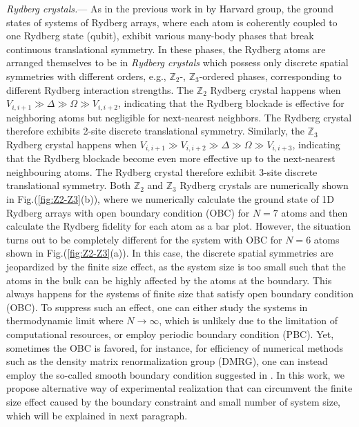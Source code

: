 \documentclass[%
 reprint,
nofootinbib,
 amsmath,amssymb,
 aps,
pra,
floatfix,
]{revtex4-2}
\begin{document}
\emph{Rydberg crystals.}--- As in the previous work in \cite{Bernien2017ProbingSimulator} by Harvard group, the ground states of systems of Rydberg arrays, where each atom is coherently coupled to one Rydberg state (qubit), exhibit various many-body phases that break continuous translational symmetry. In these phases, the Rydberg atoms are arranged themselves to be in \emph{Rydberg crystals} which possess only discrete spatial symmetries with different orders, e.g., $\mathbb{Z}_2$-, $\mathbb{Z}_3$-ordered phases, corresponding to different Rydberg interaction strengths. The $\mathbb{Z}_2$ Rydberg crystal happens when $V_{i,i+1} \gg \Delta \gg \Omega \gg V_{i,i+2}$, indicating that the Rydberg blockade is effective for neighboring atoms but negligible for next-nearest neighbors. The Rydberg crystal therefore exhibits 2-site discrete translational symmetry. Similarly, the $\mathbb{Z}_3$ Rydberg crystal happens when $V_{i,i+1} \gg V_{i,i+2} \gg \Delta \gg \Omega \gg V_{i,i+3}$, indicating that the Rydberg blockade become even more effective up to the next-nearest neighbouring atoms. The Rydberg crystal therefore exhibit 3-site discrete translational symmetry. Both $\mathbb{Z}_2$ and $\mathbb{Z}_3$ Rydberg crystals are numerically shown in Fig.(\ref{fig:Z2-Z3}(b)), where we numerically calculate the ground state of 1D Rydberg arrays with open boundary condition (OBC) for $N=7$ atoms and then calculate the Rydberg fidelity for each atom as a bar plot. However, the situation turns out to be completely different for the system with OBC for $N=6$ atoms shown in Fig.(\ref{fig:Z2-Z3}(a)). In this case, the discrete spatial symmetries are jeopardized by the finite size effect, as the system size is too small such that the atoms in the bulk can be highly affected by the atoms at the boundary. This always happens for the systems of finite size that satisfy open boundary condition (OBC). To suppress such an effect, one can either study the systems in thermodynamic limit where $N \to \infty$, which is unlikely due to the limitation of computational resources, or employ periodic boundary condition (PBC). Yet, sometimes the OBC is favored, for instance, for efficiency of numerical methods such as the density matrix renormalization group (DMRG), one can instead employ the so-called smooth boundary condition suggested in \cite{Hikihara2011ConnectingDeformation}.  In this work, we propose alternative way of experimental realization that can circumvent the finite size effect caused by the boundary constraint and small number of system size, which will be explained in next paragraph. 
\end{document}
